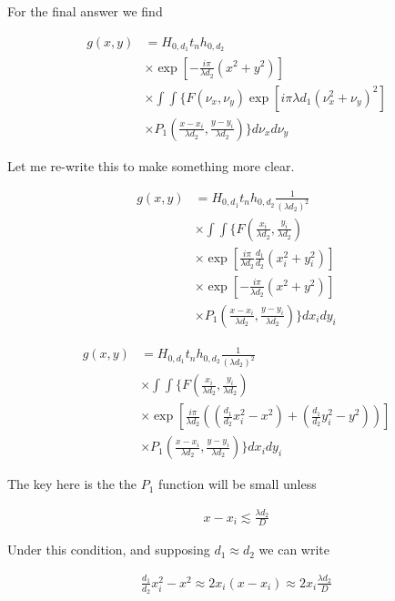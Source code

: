 \documentclass[12pt]{article}
\begin{document}
For the final answer we find

\begin{align}
g(x,y) &= H_{0,d_1} t_n h_{0,d_2}\\
&\times \exp\left[-\frac{i\pi}{\lambda d_2}(x^2+y^2)\right]\\
&\times \int\int \Bigg\{F(\nu_x,\nu_y) \exp\left[i\pi \lambda d_1 (\nu_x^2+\nu_y)^2 \right]\\
&\times P_1\left(\frac{x-x_i}{\lambda d_2},\frac{y-y_i}{\lambda d_2}\right) \Bigg\}d\nu_x d\nu_y
\end{align}

Let me re-write this to make something more clear.

\begin{align}
g(x,y) &= H_{0,d_1} t_n h_{0,d_2} \frac{1}{(\lambda d_2)^2}\\
&\times \int\int \Bigg\{F(\frac{x_i}{\lambda d_2},\frac{y_i}{\lambda d_2})\\
&\times \exp\left[\frac{i\pi}{\lambda d_2}\frac{d_1}{d_2} (x_i^2+y_i^2) \right]\\
&\times \exp\left[-\frac{i\pi}{\lambda d_2}(x^2+y^2)\right]\\
&\times P_1\left(\frac{x-x_i}{\lambda d_2},\frac{y-y_i}{\lambda d_2}\right) \Bigg\}dx_i dy_i
\end{align}

\begin{align}
g(x,y) &= H_{0,d_1} t_n h_{0,d_2} \frac{1}{(\lambda d_2)^2}\\
&\times \int\int \Bigg\{F\left(\frac{x_i}{\lambda d_2},\frac{y_i}{\lambda d_2}\right)\\
&\times \exp\left[\frac{i\pi}{\lambda d_2}(\left(\frac{d_1}{d_2}x_i^2-x^2\right)+\left(\frac{d_1}{d_2}y_i^2-y^2\right)) \right]\\
&\times P_1\left(\frac{x-x_i}{\lambda d_2},\frac{y-y_i}{\lambda d_2}\right) \Bigg\}dx_i dy_i
\end{align}

The key here is the the $P_1$ function will be small unless

\begin{align}
x-x_i \lesssim \frac{\lambda d_2}{D}
\end{align}

Under this condition, and supposing $d_1 \approx d_2$ we can write

\begin{align}
\frac{d_1}{d_2}x_i^2 - x^2 \approx 2x_i(x-x_i) \approx 2x_i \frac{\lambda d_2}{D}
\end{align}
\end{document}
